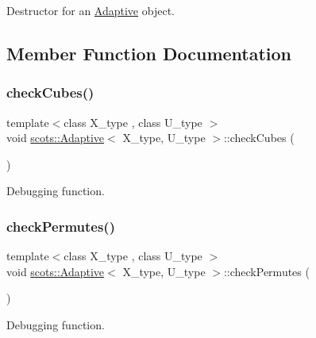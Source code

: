 Destructor for an \hyperlink{classscots_1_1Adaptive}{Adaptive} object. 

\subsection{Member Function Documentation}
\mbox{\label{classscots_1_1Adaptive_a5e8e6dc690e2c800338fd2c866af8889}} 
\subsubsection{\texorpdfstring{check\+Cubes()}{checkCubes()}}
{\footnotesize\ttfamily template$<$class X\+\_\+type , class U\+\_\+type $>$ \\
void \hyperlink{classscots_1_1Adaptive}{scots\+::\+Adaptive}$<$ X\+\_\+type, U\+\_\+type $>$\+::check\+Cubes (\begin{DoxyParamCaption}{ }\end{DoxyParamCaption})\hspace{0.3cm}{\ttfamily [inline]}}

Debugging function. \mbox{\label{classscots_1_1Adaptive_aba179a9fad6056239005127af2e95f45}} 
\subsubsection{\texorpdfstring{check\+Permutes()}{checkPermutes()}}
{\footnotesize\ttfamily template$<$class X\+\_\+type , class U\+\_\+type $>$ \\
void \hyperlink{classscots_1_1Adaptive}{scots\+::\+Adaptive}$<$ X\+\_\+type, U\+\_\+type $>$\+::check\+Permutes (\begin{DoxyParamCaption}{ }\end{DoxyParamCaption})\hspace{0.3cm}{\ttfamily [inline]}}

Debugging function. \mbox{\label{classscots_1_1Adaptive_af6aeb2170e7223c1396454ab2b83fb09}} 
